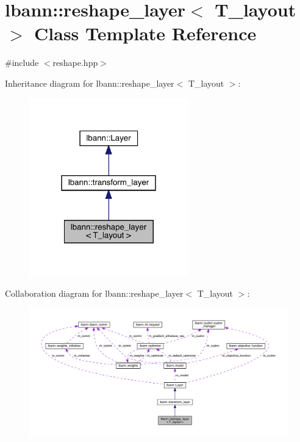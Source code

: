 \hypertarget{classlbann_1_1reshape__layer}{}\section{lbann\+:\+:reshape\+\_\+layer$<$ T\+\_\+layout $>$ Class Template Reference}
\label{classlbann_1_1reshape__layer}


{\ttfamily \#include $<$reshape.\+hpp$>$}



Inheritance diagram for lbann\+:\+:reshape\+\_\+layer$<$ T\+\_\+layout $>$\+:\nopagebreak
\begin{figure}[H]
\begin{center}
\leavevmode
\includegraphics[width=195pt]{classlbann_1_1reshape__layer__inherit__graph}
\end{center}
\end{figure}


Collaboration diagram for lbann\+:\+:reshape\+\_\+layer$<$ T\+\_\+layout $>$\+:\nopagebreak
\begin{figure}[H]
\begin{center}
\leavevmode
\includegraphics[width=350pt]{classlbann_1_1reshape__layer__coll__graph}
\end{center}
\end{figure}
